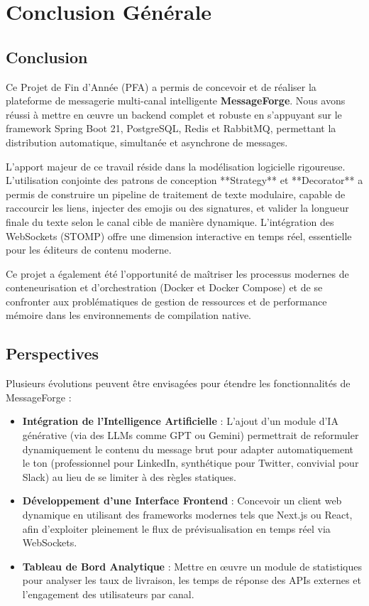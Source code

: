 \chapter*{Conclusion Générale}
\label{chapter:Conclusion}
\setcounter{section}{0}

\section{Conclusion}

Ce Projet de Fin d'Année (PFA) a permis de concevoir et de réaliser la plateforme de messagerie multi-canal intelligente \textbf{MessageForge}. Nous avons réussi à mettre en œuvre un backend complet et robuste en s'appuyant sur le framework Spring Boot 21, PostgreSQL, Redis et RabbitMQ, permettant la distribution automatique, simultanée et asynchrone de messages.

L'apport majeur de ce travail réside dans la modélisation logicielle rigoureuse. L'utilisation conjointe des patrons de conception **Strategy** et **Decorator** a permis de construire un pipeline de traitement de texte modulaire, capable de raccourcir les liens, injecter des emojis ou des signatures, et valider la longueur finale du texte selon le canal cible de manière dynamique. L'intégration des WebSockets (STOMP) offre une dimension interactive en temps réel, essentielle pour les éditeurs de contenu moderne.

Ce projet a également été l'opportunité de maîtriser les processus modernes de conteneurisation et d'orchestration (Docker et Docker Compose) et de se confronter aux problématiques de gestion de ressources et de performance mémoire dans les environnements de compilation native.

\section{Perspectives}

Plusieurs évolutions peuvent être envisagées pour étendre les fonctionnalités de MessageForge :

\begin{itemize}
    \item \textbf{Intégration de l'Intelligence Artificielle} : L'ajout d'un module d'IA générative (via des LLMs comme GPT ou Gemini) permettrait de reformuler dynamiquement le contenu du message brut pour adapter automatiquement le ton (professionnel pour LinkedIn, synthétique pour Twitter, convivial pour Slack) au lieu de se limiter à des règles statiques.
    \item \textbf{Développement d'une Interface Frontend} : Concevoir un client web dynamique en utilisant des frameworks modernes tels que Next.js ou React, afin d'exploiter pleinement le flux de prévisualisation en temps réel via WebSockets.
    \item \textbf{Tableau de Bord Analytique} : Mettre en œuvre un module de statistiques pour analyser les taux de livraison, les temps de réponse des APIs externes et l'engagement des utilisateurs par canal.
\end{itemize}
